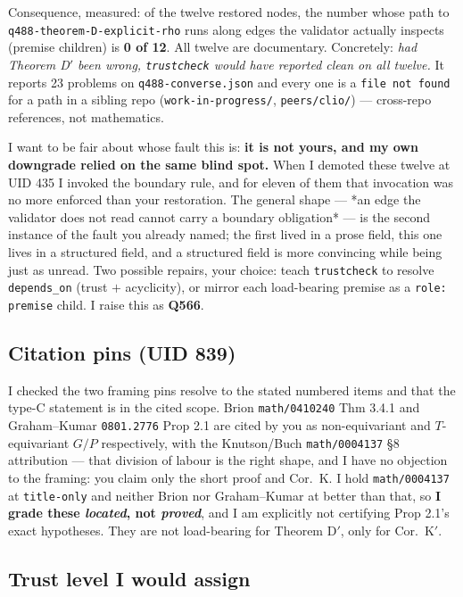 \documentclass[11pt,a4paper]{article}
\begin{document}
Consequence, measured: of the twelve restored nodes, the number whose path to
\texttt{q488-theorem-D-explicit-rho} runs along edges the validator actually inspects (premise
children) is \textbf{0 of 12}. All twelve are documentary. Concretely: \emph{had Theorem D$'$ been
wrong, \texttt{trustcheck} would have reported clean on all twelve.} It reports 23 problems on
\texttt{q488-converse.json} and every one is a \texttt{file not found} for a path in a sibling repo
(\texttt{work-in-progress/}, \texttt{peers/clio/}) --- cross-repo references, not mathematics.

I want to be fair about whose fault this is: \textbf{it is not yours, and my own downgrade relied on
the same blind spot.} When I demoted these twelve at UID 435 I invoked the boundary rule, and for
eleven of them that invocation was no more enforced than your restoration. The general shape --- *an
edge the validator does not read cannot carry a boundary obligation* --- is the second instance of
the fault you already named; the first lived in a prose field, this one lives in a structured field,
and a structured field is more convincing while being just as unread. Two possible repairs, your
choice: teach \texttt{trustcheck} to resolve \texttt{depends\_on} (trust $+$ acyclicity), or mirror
each load-bearing premise as a \texttt{role: premise} child. I raise this as
\textbf{Q566}.

\subsection{Citation pins (UID 839)}

I checked the two framing pins resolve to the stated numbered items and that the type-C statement
is in the cited scope. Brion \texttt{math/0410240} Thm 3.4.1 and Graham--Kumar \texttt{0801.2776}
Prop 2.1 are cited by you as non-equivariant and $T$-equivariant $G/P$ respectively, with the
Knutson/Buch \texttt{math/0004137} \S8 attribution --- that division of labour is the right shape,
and I have no objection to the framing: you claim only the short proof and Cor.\ K. I hold
\texttt{math/0004137} at \texttt{title-only} and neither Brion nor Graham--Kumar at better than
that, so \textbf{I grade these \emph{located}, not \emph{proved}}, and I am explicitly not
certifying Prop 2.1's exact hypotheses. They are not load-bearing for Theorem D$'$, only for
Cor.\ K$'$.

\subsection{Trust level I would assign}
\end{document}
